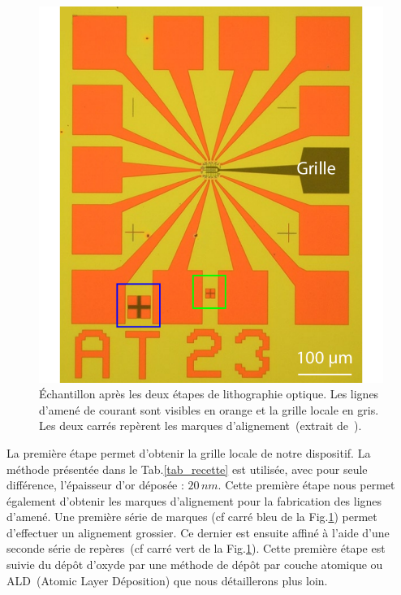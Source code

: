 \begin{figure}
\parbox{6.5cm}{
\includegraphics[scale=0.45]{Fabrication/LithoOptique/LithoOptique.pdf} 
}
\parbox{7cm}{\caption{Échantillon après les deux étapes de lithographie optique. Les lignes d'amené de courant sont visibles en orange et la grille locale en gris. Les deux carrés repèrent les marques d'alignement~(extrait de~\cite{RochPhD}).}
\label{LithoOptique}
}
\end{figure}

La première étape permet d'obtenir la grille locale de notre dispositif. La méthode présentée dans le Tab.\ref{tab_recette} est utilisée, avec pour seule différence, l'épaisseur d'or déposée : $20\,nm$. 
Cette première étape nous permet également d'obtenir les marques d'alignement pour la fabrication des lignes d'amené. Une première série de marques (cf carré bleu de la Fig.\ref{LithoOptique}) permet d'effectuer un alignement grossier. Ce dernier est ensuite affiné à l'aide d'une seconde série de repères~(cf carré vert de la Fig.\ref{LithoOptique}). Cette première étape est suivie du dépôt d'oxyde par une méthode de dépôt par couche atomique ou ALD~(Atomic Layer Déposition) que nous détaillerons plus loin.



